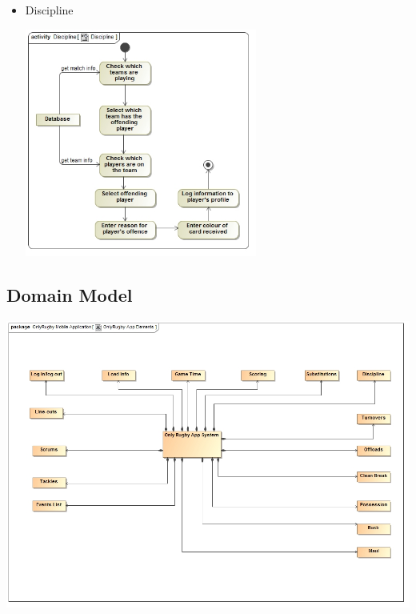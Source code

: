 \documentclass[a4paper,12pt]{report}
\begin{document}
\begin{itemize}
\begin{center}
		\end{center}
	\item Discipline
		\begin{center}
		\includegraphics[width=0.6\textwidth] {./Diagrams/DisciplineActivityDiagram.jpg}\\[0.4cm]
		\end{center}
\end{itemize}
\subsection{Domain Model}
	\begin{center}
  	 	\includegraphics[width=1\textwidth] {./Diagrams/DomainModel.jpg}\\[0.4cm]    
	\end{center}
\end{document}
